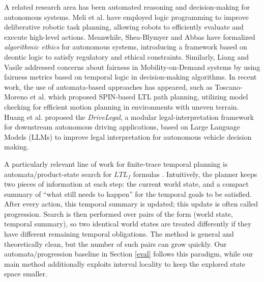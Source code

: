 \documentclass[]{jair}
\begin{document}
A related research area has been automated reasoning and decision-making for autonomous systems. Meli et al. \cite{melilogic} have employed logic programming to improve deliberative robotic task planning, allowing robots to efficiently evaluate and execute high-level actions.
Meanwhile, Shea-Blymyer and Abbas \cite{10.1145/3460975} have formalized {\it algorithmic ethics} for autonomous systems, introducing a framework based on deontic logic \cite{von1951deontic} to satisfy regulatory and ethical constraints. Similarly, 
 Liang and Vasile \cite{fairplanning} addressed concerns about fairness in Mobility-on-Demand systems by using fairness metrics based on temporal logic in decision-making algorithms.
In recent work, the use of automata-based approaches has appeared, such as Toscano-Moreno et al. \cite{li2024spin} which proposed SPIN-based LTL path planning, utilizing model checking for efficient motion planning in environments with uneven terrain. Huang et al. \cite{HUANG2026131593} proposed the \emph{DriveLegal}, a modular legal-interpretation framework for downstream autonomous driving applications, based on Large Language Models (LLMs) to improve legal interpretation for autonomous vehicle decision making.

A particularly relevant line of work for finite-trace temporal planning is automata/product-state search for $LTL_f$ formulas \cite{degiacomo2013ltlf,camacho2018finite}. Intuitively, the planner keeps two pieces of information at each step: the current world state, and a compact summary of ``what still needs to happen'' for the temporal goals to be satisfied. After every action, this temporal summary is updated; this update is often called progression. Search is then performed over pairs of the form (world state, temporal summary), so two identical world states are treated differently if they have different remaining temporal obligations. The method is general and theoretically clean, but the number of such pairs can grow quickly. Our automata/progression baseline in Section \ref{eval} follows this paradigm, while our main method additionally exploits interval locality to keep the explored state space smaller.
\end{document}
